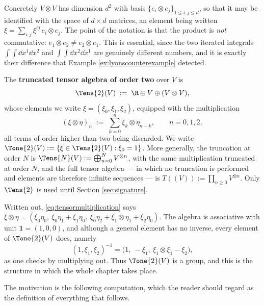 Concretely $V\otimes V$ has dimension $d^2$ with basis $\{e_i\otimes e_j\}_{1\leq i,j\leq d}$, so
that it may be identified with the space of $d\times d$ matrices, an element being written
$\xi = \sum_{i,j}\xi^{ij}\,e_i\otimes e_j$. The point of the notation is that the product is
\emph{not} commutative: $e_1\otimes e_2 \neq e_2\otimes e_1$. This is essential, since the two
iterated integrals $\int\!\!\int \dd x^1\dd x^2$ and $\int\!\!\int \dd x^2 \dd x^1$ are genuinely
different numbers, and it is exactly their difference that Example \ref{ex:lyonscounterexample}
detected.

\begin{definition}\label{def:tensoralgebra}
The \textbf{truncated tensor algebra of order two} over $V$ is
\begin{equation}\label{eq:tensoralgebra}
\Tens{2}(V) \;:=\; \R \oplus V \oplus (V\otimes V),
\end{equation}
whose elements we write $\xi = (\xi_0,\xi_1,\xi_2)$, equipped with the multiplication
\begin{equation}\label{eq:tensormultiplication}
(\xi \otimes \eta)_n \;:=\; \sum_{k=0}^{n} \xi_k \otimes \eta_{n-k}, \qquad n = 0,1,2,
\end{equation}
all terms of order higher than two being discarded. We write
$\Tone{2}(V) := \{\xi \in \Tens{2}(V) : \xi_0 = 1\}$. More generally, the truncation at order $N$ is
$\Tens{N}(V) := \bigoplus_{n=0}^{N} V^{\otimes n}$, with the same multiplication truncated at order
$N$, and the full tensor algebra --- in which no truncation is performed and elements are therefore
infinite sequences --- is $T((V)) := \prod_{n \geq 0} V^{\otimes n}$. Only $\Tens{2}$ is used until
Section \ref{sec:signature}.
\end{definition}

Written out, \eqref{eq:tensormultiplication} says
$\xi\otimes\eta = (\xi_0\eta_0,\ \xi_0\eta_1 + \xi_1\eta_0,\ \xi_0\eta_2 + \xi_1\otimes\eta_1 + \xi_2\eta_0)$.
The algebra is associative with unit $\mathbf{1} = (1,0,0)$, and although a general element has no
inverse, every element of $\Tone{2}(V)$ does, namely
\begin{equation}\label{eq:tensorinverse}
(1,\xi_1,\xi_2)^{-1} = \bigl(1,\ -\xi_1,\ \xi_1\otimes\xi_1 - \xi_2\bigr),
\end{equation}
as one checks by multiplying out. Thus $\Tone{2}(V)$ is a group, and this is the structure in which
the whole chapter takes place.

The motivation is the following computation, which the reader should regard as the definition of
everything that follows.

